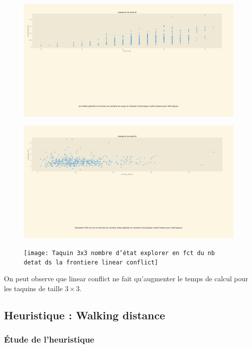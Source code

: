 \documentclass[a4paper, 12pt]{article}
\begin{document}
\begin{figure}[H]
    \centering
    \includegraphics[width=\textwidth]{Taquin 3x3 nombre d'etats generer en fct du nb de coups linear conflict}
\end{figure}
\begin{figure}[H]
    \centering
    \includegraphics[width=\textwidth]{Taquin 3x3 utilisation CPU en fct du nb d'etat generer linear conflict}
\end{figure}
\begin{figure}[H]
    \centering
    \texttt{[image: Taquin 3x3 nombre d'état explorer en fct du nb detat ds la frontiere linear conflict]}
\end{figure}

On peut observe que linear conflict ne fait qu'augmenter le temps de calcul pour les taquins de taille $3 \times 3$. 
\subsection{Heuristique : Walking distance}

\subsubsection{Étude de l'heuristique}
\end{document}
